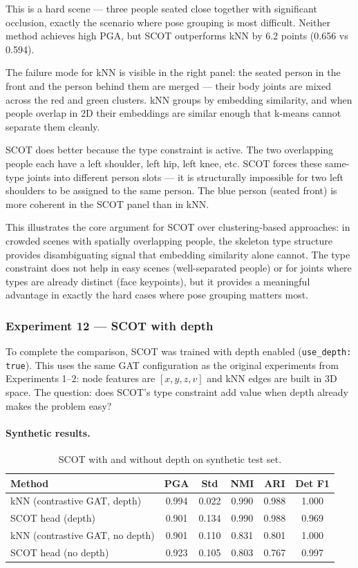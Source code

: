 This is a hard scene --- three people seated close together with significant occlusion, exactly the scenario where pose grouping is most difficult. Neither method achieves high PGA, but SCOT outperforms kNN by 6.2 points (0.656 vs 0.594).

The failure mode for kNN is visible in the right panel: the seated person in the front and the person behind them are merged --- their body joints are mixed across the red and green clusters. kNN groups by embedding similarity, and when people overlap in 2D their embeddings are similar enough that k-means cannot separate them cleanly.

SCOT does better because the type constraint is active. The two overlapping people each have a left shoulder, left hip, left knee, etc. SCOT forces these same-type joints into different person slots --- it is structurally impossible for two left shoulders to be assigned to the same person. The blue person (seated front) is more coherent in the SCOT panel than in kNN.

This illustrates the core argument for SCOT over clustering-based approaches: in crowded scenes with spatially overlapping people, the skeleton type structure provides disambiguating signal that embedding similarity alone cannot. The type constraint does not help in easy scenes (well-separated people) or for joints where types are already distinct (face keypoints), but it provides a meaningful advantage in exactly the hard cases where pose grouping matters most.


\subsubsection{Experiment 12 --- SCOT with depth}

To complete the comparison, SCOT was trained with depth enabled (\texttt{use\_depth: true}). This uses the same GAT configuration as the original experiments from Experiments 1--2: node features are $[x, y, z, v]$ and kNN edges are built in 3D space. The question: does SCOT's type constraint add value when depth already makes the problem easy?

\paragraph{Synthetic results.}

\begin{table}[H]
\centering
\footnotesize
\begin{tabular}{lccccc}
\toprule
Method & PGA & Std & NMI & ARI & Det F1 \\
\midrule
kNN (contrastive GAT, depth) & 0.994 & 0.022 & 0.990 & 0.988 & 1.000 \\
SCOT head (depth) & 0.901 & 0.134 & 0.990 & 0.988 & 0.969 \\
\midrule
kNN (contrastive GAT, no depth) & 0.901 & 0.110 & 0.831 & 0.801 & 1.000 \\
SCOT head (no depth) & 0.923 & 0.105 & 0.803 & 0.767 & 0.997 \\
\bottomrule
\end{tabular}
\caption{SCOT with and without depth on synthetic test set.}
\end{table}

